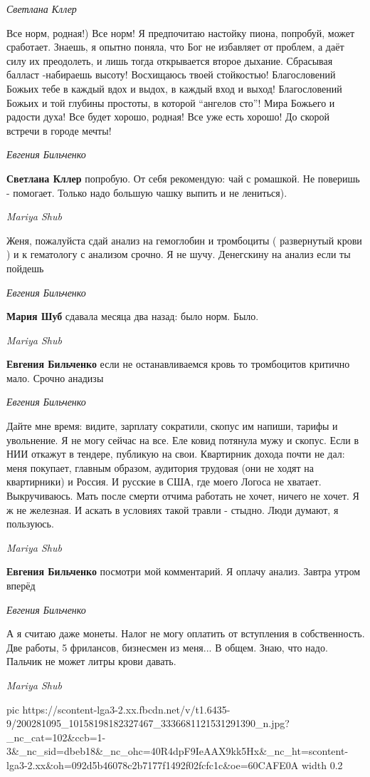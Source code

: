 \emph{Светлана Кллер}

Все норм, родная!) Все норм! Я предпочитаю настойку пиона, попробуй, может
сработает. Знаешь, я опытно поняла, что Бог не избавляет от проблем, а даёт
силу их преодолеть, и лишь тогда открывается второе дыхание. Сбрасывая балласт
-набираешь высоту! Восхищаюсь твоей стойкостью! Благословений Божьих тебе в
каждый вдох и выдох, в каждый вход и выход! Благословений Божьих и той глубины
простоты, в которой \enquote{ангелов сто}! Мира Божьего и радости духа! Все будет
хорошо, родная! Все уже есть хорошо! До скорой встречи в городе мечты!

\emph{Евгения Бильченко}

\textbf{Светлана Кллер} попробую. От себя рекомендую: чай с ромашкой. Не поверишь -
помогает. Только надо большую чашку выпить и не лениться).

\emph{Mariya Shub}

Женя, пожалуйста сдай анализ на гемоглобин и тромбоциты ( развернутый крови ) и
к гематологу с анализом срочно. Я не шучу. Денегскину на анализ если ты
пойдешь

\emph{Евгения Бильченко}

\textbf{Мария Шуб} сдавала месяца два назад: было норм. Было.

\emph{Mariya Shub}

\textbf{Евгения Бильченко} если не останавливаемся кровь то тромбоцитов критично мало. Срочно анадизы

\emph{Евгения Бильченко}

Дайте мне время: видите, зарплату сократили, скопус им напиши, тарифы и
увольнение. Я не могу сейчас на все. Еле ковид потянула мужу и скопус. Если в
НИИ откажут в тендере, публикую на свои. Квартирник дохода почти не дал: меня
покупает, главным образом, аудитория трудовая (они не ходят на квартирники) и
Россия. И русские в США, где моего Логоса не хватает. Выкручиваюсь. Мать после
смерти отчима работать не хочет, ничего не хочет. Я ж не железная. И аскать в
условиях такой травли - стыдно. Люди думают, я пользуюсь.

\emph{Mariya Shub}

\textbf{Евгения Бильченко} посмотри мой комментарий. Я оплачу анализ. Завтра
утром вперёд

\emph{Евгения Бильченко}

А я считаю даже монеты. Налог не могу оплатить от вступления в собственность.
Две работы, 5 фрилансов, бизнесмен из меня... В общем. Знаю, что надо. Пальчик
не может литры крови давать.

\emph{Mariya Shub}

\ifcmt
  pic https://scontent-lga3-2.xx.fbcdn.net/v/t1.6435-9/200281095_10158198182327467_3336681121531291390_n.jpg?_nc_cat=102&ccb=1-3&_nc_sid=dbeb18&_nc_ohc=40R4dpF9IeAAX9kk5Hx&_nc_ht=scontent-lga3-2.xx&oh=092d5b46078c2b7177f1492f02fcfc1c&oe=60CAFE0A
	width 0.2
\fi


